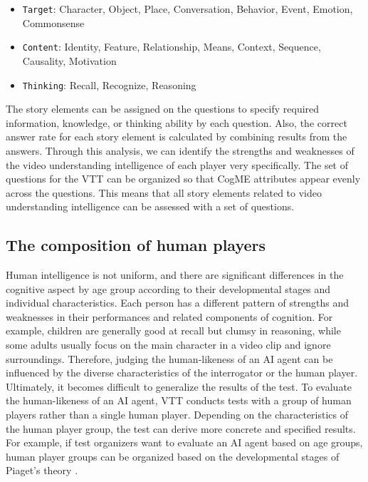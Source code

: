 \documentclass[letterpaper]{article} %
\begin{document}
\begin{itemize}
\item \texttt{Target}: Character, Object, Place, Conversation, Behavior, Event, Emotion, Commonsense
\item \texttt{Content}: Identity, Feature, Relationship, Means, Context, Sequence, Causality, Motivation
\item \texttt{Thinking}: Recall, Recognize, Reasoning
\end{itemize}

The story elements can be assigned on the questions to specify required information, knowledge, or thinking ability by each question. Also, the correct answer rate for each story element is calculated by combining results from the answers. Through this analysis, we can identify the strengths and weaknesses of the video understanding intelligence of each player very specifically.
The set of questions for the VTT can be organized so that CogME attributes appear evenly across the questions. This means that all story elements related to video understanding intelligence can be assessed with a set of questions.

\subsection{The composition of human players}
Human intelligence is not uniform, and there are significant differences in the cognitive aspect by age group according to their developmental stages and individual characteristics. Each person has a different pattern of strengths and weaknesses in their performances and related components of cognition. For example, children are generally good at recall but clumsy in reasoning, while some adults usually focus on the main character in a video clip and ignore surroundings. Therefore, judging the human-likeness of an AI agent can be influenced by the diverse characteristics of the interrogator or the human player. Ultimately, it becomes difficult to generalize the results of the test. To evaluate the human-likeness of an AI agent, VTT conducts tests with a group of human players rather than a single human player. Depending on the characteristics of the human player group, the test can derive more concrete and specified results. For example, if test organizers want to evaluate an AI agent based on age groups, human player groups can be organized based on the developmental stages of Piaget's theory \cite{Piaget1972CogDev}.
\end{document}
